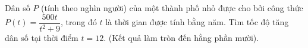 \begin{bt}%
	Dân số $P$ (tính theo nghìn người) của một thành phố nhỏ được cho bởi công thức $P(t)=\dfrac{500t}{t^2+9}$, trong đó $t$ là thời gian được tính bằng năm. Tìm tốc độ tăng dân số tại thời điểm $t=12$. (Kết quả làm tròn đến hằng phần mười).
	
\end{bt}
